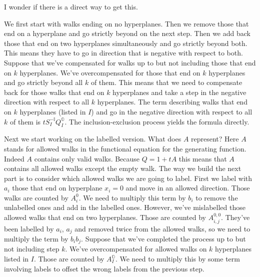 \documentclass[12pt]{article}
\newcommand{\oo}{\mathbb{O}}
\newcommand{\one}{\mathbb{I}}
\theoremstyle{definition} \newtheorem{definition}[theorem]{Definition}
\begin{document}
I wonder if there is a direct way to get this.

We first start with walks ending on no hyperplanes. Then we remove those that end on a hyperplane and go strictly beyond on the next step. Then we add back those that end on two hyperplanes simultaneously and go strictly beyond both. This means they have to go in direction that is negative with respect to both. Suppose that we've compensated for walks up to but not including those that end on $k$ hyperplanes. We've overcompensated for those that end on $k$ hyperplanes and go strictly beyond all $k$ of them. This means that we need to compensate back for those walks that end on $k$ hyperplanes and take a step in the negative direction with respect to all $k$ hyperplanes. The term describing walks that end on $k$ hyperplanes (listed in $I$) and go in the negative direction with respect to all $k$ of them is $tS_I^{-\one}Q_I^\oo$. The inclusion-exclusion process yields the formula directly.

Next we start working on the labelled version. What does $A$ represent? Here $A$ stands for allowed walks in the functional equation for the generating function. Indeed $A$ contains only valid walks. Because $Q = 1 + tA$ this means that $A$ contains all allowed walks except the empty walk. The way we build the next part is to consider which allowed walks we are going to label. First we label with $a_i$ those that end on hyperplane $x_i = 0$ and move in an allowed direction. Those walks are counted by $A_i^0$. We need to multiply this term by $b_i$ to remove the unlabelled ones and add in the labelled ones. However, we've mislabelled those allowed walks that end on two hyperplanes. Those are counted by $A_{i,j}^{0,0}$. They've been labelled by $a_i$, $a_j$ and removed twice from the allowed walks, so we need to multiply the term by $b_ib_j$. Suppose that we've completed the process up to but not including step $k$. We've overcompensated for allowed walks on $k$ hyperplanes listed in $I$. Those are counted by $A_I^\oo$. We need to multiply this by some term involving labels to offset the wrong labels from the previous step. 
\end{document}
